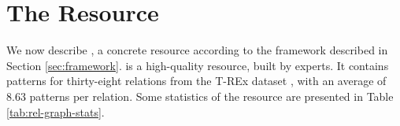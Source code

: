 \section{The \resource{} Resource}
\label{sec:rel-graph}

We now describe \resource{}, a concrete resource according to the framework described in Section \ref{sec:framework}.
\resource{} is a high-quality resource, built by experts.
It contains patterns for thirty-eight relations from the T-REx dataset \cite{trex}, with an average of 8.63 patterns per relation.
Some statistics of the resource are presented in Table \ref{tab:rel-graph-stats}.








